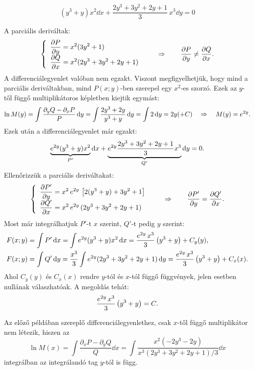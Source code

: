 \begin{example}
  $$
    (y^3 + y) x^2 \dd x
    + \frac{2y^3 + 3y^2 + 2y + 1}{3} \, x^3 \dd y
    = 0
  $$
  \boxrule

  A parciális deriváltak:
  $$
    \left\{
    \begin{array}{l}
      \displaystyle\pdv{P}{y} = x^2 (3y^2 + 1)
      \\[.33em]
      \displaystyle\pdv{Q}{x} = x^2 (2y^3 + 3y^2 + 2y + 1)
    \end{array}
    \right.
    \qquad \Rightarrow \qquad
    \pdv{P}{y} \neq \pdv{Q}{x}
    \text.
  $$
  A differenciálegyenlet valóban nem egzakt. Viszont megfigyelhetjük, hogy
  mind a parciális deriváltakban, mind $P(x; y)$-ben szerepel egy $x^2$-es
  szorzó. Ezek az $y$-től függő multiplikátoros képletben kiejtik egymást:
  $$
    \ln M(y)
    = \int \frac{\partial_y Q - \partial_x P}{P} \mathop{}\!\mathrm{d} y
    = \int \frac{2y^3 + 2y}{y^3 + y} \mathop{}\!\mathrm{d} y
    = \int 2 \mathop{}\!\mathrm{d} y
    = 2y(+ C)
    \quad\Rightarrow\quad
    M(y) = e^{2y}
    \text.
  $$
  Ezek után a differenciálegyenlet már egzakt:
  $$
    \underbrace{e^{2y} (y^3 + y) x^2}_{P'} \mathop{}\!\mathrm{d} x
    + \underbrace{e^{2y} \frac{2y^3 + 3y^2 + 2y + 1}{3} x^3}_{Q'} \mathop{}\!\mathrm{d} y
    = 0
    \text.
  $$
  \vspace{-1em}
  Ellenőrizzük a parciális deriváltakat:
  $$
    \left\{
    \begin{array}{l}
      \displaystyle\pdv{P'}{y} = x^2\,e^{2y}\,\left[
        2(y^3 + y) + 3y^2 + 1
        \right]
      \\[.33em]
      \displaystyle\pdv{Q'}{x} = x^2\,e^{2y}\,(2y^3+3y^2+2y+1)
    \end{array}
    \right.
    \qquad \Rightarrow \qquad
    \pdv{P'}{y} = \pdv{Q'}{x}
    \text.
  $$
  Most már integrálhatjuk $P'$-t $x$ szerint, $Q'$-t pedig $y$ szerint:
  \begin{align*}
    F(x;y) & = \int P' \mathop{}\!\mathrm{d} x
    = \int e^{2y} (y^3 + y) x^2 \mathop{}\!\mathrm{d} x
    = \frac{e^{2y} \, x^3}{3} \left( y^3 + y \right) + C_y(y)
    \text,
    \\
    F(x;y) & = \int Q' \mathop{}\!\mathrm{d} y
    = \frac{x^3}{3} \int e^{2y} (2y^3 + 3y^2 + 2y + 1) \mathop{}\!\mathrm{d} y
    = \frac{e^{2y} \, x^3}{3} \left( y^3 + y \right) + C_x(x)
    \text.
  \end{align*}
  Ahol $C_y(y)$ és $C_x(x)$ rendre $y$-tól és $x$-tól függő függvények,
  jelen esetben nullának válaszhatóak. A megoldás tehát:
  $$
    \frac{e^{2y} \, x^3}{3} \left( y^3 + y \right) = C
    \text.
  $$
\end{example}

\begin{note}[][nobreak]
  Az előző példában szereplő differenciálegyenlethez, csak $x$-től függő
  multiplikátor nem létezik, hiszen az
  $$
    \ln M(x)
    = \int \frac{\partial_x P - \partial_y Q}{Q} \dd x
    = \int \frac{x^2\left(-2y^3 - 2y\right)}{x^3\left(2y^3 + 3y^2 + 2y + 1\right)/3} \dd x
  $$
  integrálban az integrálandó tag $y$-tól is függ.
\end{note}